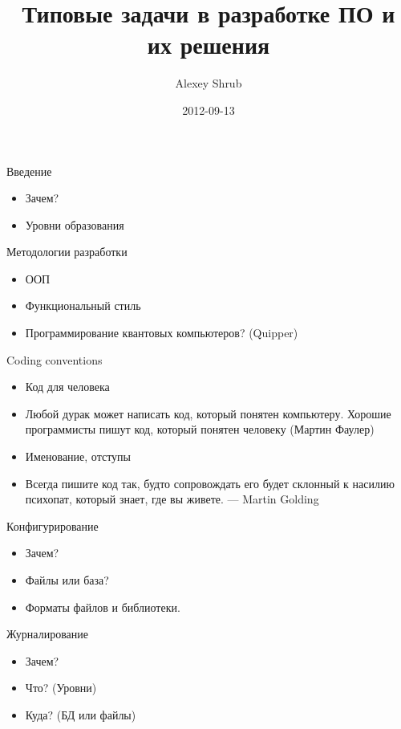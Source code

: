 \documentclass[aspectratio=169]{beamer}
\title{Типовые задачи в разработке ПО и их решения}
\author{Alexey Shrub}
\date{2012-09-13}
\begin{document}
\maketitle

\begin{frame}{Введение}
\begin{itemize}
\item Зачем?
\pause
\item Уровни образования
\end{itemize}
\end{frame}

\begin{frame}{Методологии разработки}
\begin{itemize}
\item ООП
\pause
\item Функциональный стиль
\pause
\item Программирование квантовых компьютеров? (Quipper)
\end{itemize}
\end{frame}

\begin{frame}{Coding conventions}
\begin{itemize}
\item Код для человека
\pause
\item Любой дурак может написать код, который понятен компьютеру. Хорошие программисты пишут код, который понятен человеку (Мартин Фаулер)
\pause
\item Именование, отступы
\pause
\item Всегда пишите код так, будто сопровождать его будет склонный к насилию психопат, который знает, где вы живете. — Martin Golding
\end{itemize}
\end{frame}

\begin{frame}{Конфигурирование}
\begin{itemize}
\item Зачем?
\pause
\item Файлы или база?
\pause
\item Форматы файлов и библиотеки.
\end{itemize}
\end{frame}

\begin{frame}{Журналирование}
\begin{itemize}
\item Зачем?
\pause
\item Что? (Уровни)
\pause
\item Куда? (БД или файлы)
\end{itemize}
\end{frame}
\end{document}
